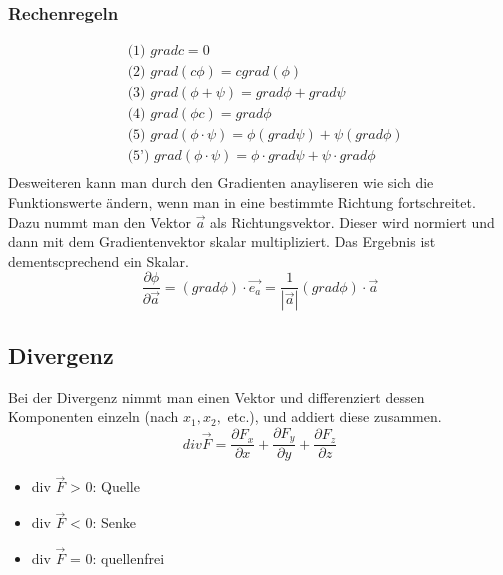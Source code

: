 \documentclass[a4paper,10pt]{scrartcl}
\begin{document}
        \subsubsection*{Rechenregeln}
        \begin{equation*}
            \begin{aligned}
                & \text{(1) } grad c = 0 \\
                & \text{(2) } grad (c\phi) = c grad(\phi) \\
                & \text{(3) } grad (\phi + \psi) = grad \phi + grad \psi \\
                & \text{(4) } grad (\phi c) = grad \phi \\
                & \text{(5) } grad (\phi \cdot \psi)= \phi(grad \psi) + \psi(grad \phi) \\
                & \text{(5') } grad (\phi \cdot \psi)= \phi \cdot grad \psi + \psi \cdot grad \phi \\
            \end{aligned}
        \end{equation*}
        Desweiteren kann man durch den Gradienten anayliseren wie sich die Funktionswerte ändern, wenn man in eine bestimmte Richtung fortschreitet. Dazu nummt man den
        Vektor \(\vec{a}\) als Richtungsvektor. Dieser wird normiert und dann mit dem Gradientenvektor skalar multipliziert. Das Ergebnis ist dementscprechend ein Skalar. 
        \begin{equation*}
            \frac{\partial \phi}{\partial \vec{a}} = (grad \phi) \cdot \vec{e_a} = \frac{1}{|\vec{a}|} (grad \phi) \cdot \vec{a}
        \end{equation*}
        
        \subsection{Divergenz}
        Bei der Divergenz nimmt man einen Vektor und differenziert dessen Komponenten einzeln (nach \(x_1, x_2,\) etc.), und addiert diese zusammen. 
        \begin{equation*}
            div \vec{F} = \frac{\partial F_x}{\partial x} + \frac{\partial F_y}{\partial y} +\frac{\partial F_z}{\partial z}
        \end{equation*} 
        \begin{itemize}
            \item div \(\vec{F}\) > 0: Quelle
            \item div \(\vec{F}\) < 0: Senke
            \item div \(\vec{F}\) = 0: quellenfrei 
        \end{itemize}
\end{document}
